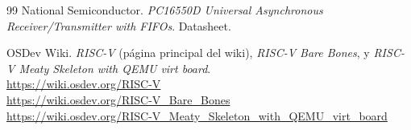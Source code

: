 \documentclass[a4paper]{article}
\begin{document}
\begin{thebibliography}{99}
National Semiconductor. \emph{PC16550D Universal Asynchronous Receiver/Transmitter with FIFOs}. Datasheet.

OSDev Wiki. \emph{RISC-V} (página principal del wiki), \emph{RISC-V Bare Bones}, y \emph{RISC-V Meaty Skeleton with QEMU
virt board}. \\
\url{https://wiki.osdev.org/RISC-V} \\
\url{https://wiki.osdev.org/RISC-V_Bare_Bones} \\
\url{https://wiki.osdev.org/RISC-V_Meaty_Skeleton_with_QEMU_virt_board}

\end{thebibliography}
\end{document}
